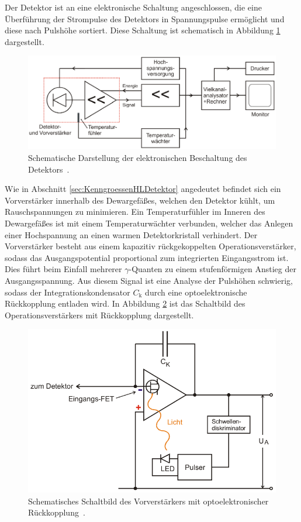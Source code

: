 Der Detektor ist an eine elektronische Schaltung angeschlossen, die eine Überführung
der Strompulse des Detektors in Spannungspulse ermöglicht und diese nach Pulshöhe sortiert.
Diese Schaltung ist schematisch in Abbildung \ref{fig:Gesamtschaltbild} dargestellt.
\begin{figure}
	\centering
	\includegraphics[width=.9\textwidth]{images/Gesamtschaltbild.pdf}
	\caption{Schematische Darstellung der elektronischen Beschaltung des Detektors~\cite[22]{anleitung}.}
	\label{fig:Gesamtschaltbild}
\end{figure}
Wie in Abschnitt \ref{sec:KenngroessenHLDetektor} angedeutet befindet sich ein Vorverstärker
innerhalb des Dewargefäßes, welchen den Detektor kühlt, um Rauschspannungen zu minimieren.
Ein Temperaturfühler im Inneren des Dewargefäßes ist mit einem Temperaturwächter verbunden,
welcher das Anlegen einer Hochspannung an einen warmen Detektorkristall verhindert.
Der Vorverstärker besteht aus einem kapazitiv rückgekoppelten Operationsverstärker, sodass
das Ausgangspotential proportional zum integrierten Eingangsstrom ist.
Dies führt beim Einfall mehrerer $\gamma$-Quanten zu einem stufenförmigen Anstieg der Ausgangsspannung.
Aus diesem Signal ist eine Analyse der Pulshöhen schwierig,
sodass der Integrationskondensator $C_\text{k}$ durch eine optoelektronische Rückkopplung
entladen wird. In Abbildung \ref{fig:Optoelektronische-Rueckkopplung} ist das Schaltbild
des Operationsverstärkers mit Rückkopplung dargestellt.
\begin{figure}
	\centering
	\includegraphics[width=.7\textwidth]{images/Optoelektronische-Rueckkopplung.pdf}
	\caption{Schematisches Schaltbild des Vorverstärkers mit optoelektronischer Rückkopplung~\cite[19]{anleitung}.}
	\label{fig:Optoelektronische-Rueckkopplung}
\end{figure}
